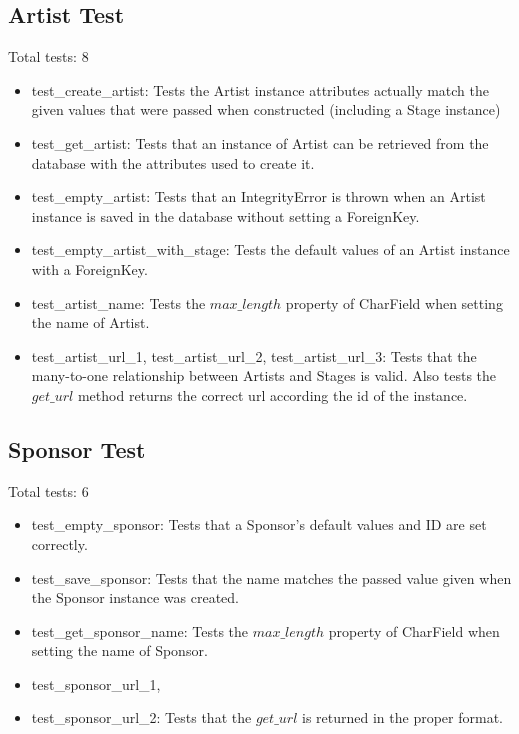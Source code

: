 \documentclass[12pt,english]{scrartcl}
\begin{document}
\subsection{Artist Test}
Total tests: 8
\begin{itemize}
\item test\_create\_artist: Tests the Artist instance attributes actually match the given values
that were passed when constructed (including a Stage instance)
 
\item test\_get\_artist: Tests that an instance of Artist can be retrieved from the database with the attributes used to create it.
 
\item test\_empty\_artist: Tests that an IntegrityError is thrown when an Artist instance is saved in the database without setting a ForeignKey.
 
\item test\_empty\_artist\_with\_stage: Tests the default values of an Artist instance with a ForeignKey.
 
\item test\_artist\_name: Tests the $max\_length$ property of CharField when setting the name of Artist.
 
\item test\_artist\_url\_1, test\_artist\_url\_2, test\_artist\_url\_3: Tests that the many-to-one relationship between
Artists and Stages is valid. Also tests the $get\_url$ method returns the correct url according the id of the instance.
\end{itemize} 

\subsection{Sponsor Test} 
Total tests: 6
\begin{itemize}
\item test\_empty\_sponsor: Tests that a Sponsor's default values and ID are set correctly.
 
\item test\_save\_sponsor: Tests that the name matches the passed value given when the Sponsor instance was created.  
 
\item test\_get\_sponsor\_name: Tests the $max\_length$ property of CharField when setting the name of Sponsor.

\item test\_sponsor\_url\_1, \item test\_sponsor\_url\_2: Tests that the $get\_url$ is returned in the proper format.
\end{itemize}
\end{document}
